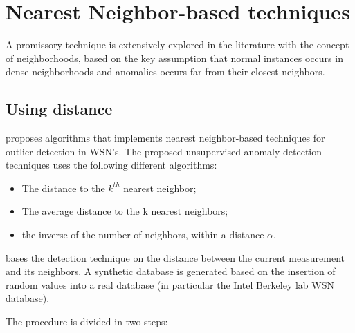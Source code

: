 
\section{Nearest Neighbor-based techniques}

\label{sec:nnbased}



A promissory technique is extensively explored in the literature with the concept of neighborhoods, based on the key assumption that normal instances occurs in dense neighborhoods and anomalies occurs far from their closest neighbors.





\subsection{Using distance}



\cite{class:branch:2006} proposes algorithms that implements nearest neighbor-based techniques for outlier detection in WSN's. The proposed unsupervised anomaly detection techniques uses the following different algorithms:



\begin{itemize}

	\setlength\itemsep{-0.5em}

	\item The distance to the $k^{th}$ nearest neighbor;

	\item The average distance to the k nearest neighbors;

	\item the inverse of the number of neighbors, within a distance $\alpha$.	

\end{itemize}



\cite{nn:abid:2016} bases the detection technique on the distance between the current measurement and its neighbors. A synthetic database is generated based on the insertion of random values into a real database (in particular the Intel Berkeley lab WSN database).

The procedure is divided in two steps: 

